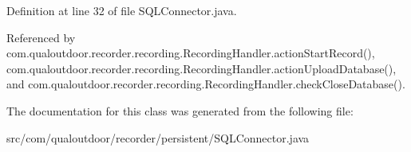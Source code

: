 Definition at line 32 of file S\-Q\-L\-Connector.\-java.



Referenced by com.\-qualoutdoor.\-recorder.\-recording.\-Recording\-Handler.\-action\-Start\-Record(), com.\-qualoutdoor.\-recorder.\-recording.\-Recording\-Handler.\-action\-Upload\-Database(), and com.\-qualoutdoor.\-recorder.\-recording.\-Recording\-Handler.\-check\-Close\-Database().



The documentation for this class was generated from the following file\-:\begin{DoxyCompactItemize}
\item 
src/com/qualoutdoor/recorder/persistent/S\-Q\-L\-Connector.\-java\end{DoxyCompactItemize}

